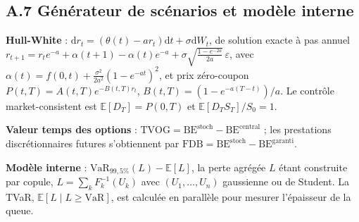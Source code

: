 \subsection*{A.7 Générateur de scénarios et modèle interne}

\textbf{Hull-White} : $\mathrm{d}r_t = (\theta(t) - a r_t)\mathrm{d}t + \sigma \mathrm{d}W_t$,
de solution exacte à pas annuel
$r_{t+1} = r_t e^{-a} + \alpha(t+1) - \alpha(t)e^{-a}
+ \sigma\sqrt{\tfrac{1-e^{-2a}}{2a}}\,\varepsilon$, avec
$\alpha(t) = f(0,t) + \tfrac{\sigma^2}{2a^2}(1-e^{-at})^2$, et prix zéro-coupon
$P(t,T) = A(t,T)e^{-B(t,T)r_t}$, $B(t,T) = (1-e^{-a(T-t)})/a$. Le contrôle market-consistent
est $\mathbb{E}[D_T] = P(0,T)$ et $\mathbb{E}[D_T S_T]/S_0 = 1$.

\textbf{Valeur temps des options} : $\mathrm{TVOG} = \mathrm{BE}^{\text{stoch}}
- \mathrm{BE}^{\text{central}}$ ; les prestations discrétionnaires futures s'obtiennent par
$\mathrm{FDB} = \mathrm{BE}^{\text{stoch}} - \mathrm{BE}^{\text{garanti}}$.

\textbf{Modèle interne} : $\mathrm{VaR}_{99{,}5\%}(L) - \mathbb{E}[L]$, la perte agrégée $L$
étant construite par copule, $L = \sum_k F_k^{-1}(U_k)$ avec $(U_1,\dots,U_n)$ gaussienne ou de
Student. La TVaR, $\mathbb{E}[L \mid L \ge \mathrm{VaR}]$, est calculée en parallèle pour
mesurer l'épaisseur de la queue.

\setlength{\parskip}{0pt}
\normalsize
